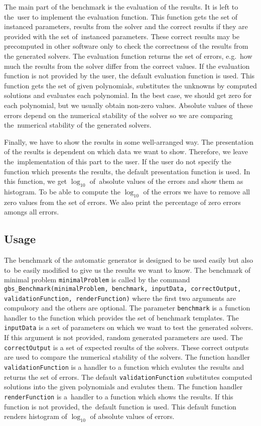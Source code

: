 The main part of the benchmark is the evaluation of the results. It is left to the~user to implement the evaluation function. This function gets the set of instanced parameters, results from the solver and the correct results if they are provided with the set of~instanced parameters. These correct results may be precomputed in other software only to check the correctness of the results from the generated solvers. The evaluation function returns the set of errors, e.g.\ how much the results from the solver differ from the correct values. If the evaluation function is not provided by the user, the default evaluation function is used. This function gets the set of given polynomials, substitutes the unknowns by computed solutions and evaluates each polynomial. In the best case, we should get zero for each polynomial, but we usually obtain non-zero values. Absolute values of these errors depend on the numerical stability of the solver so we are comparing the~numerical stability of the generated solvers.

Finally, we have to show the results in some well-arranged way. The presentation of the results is dependent on which data we want to show. Therefore, we leave the~implementation of this part to the user. If the user do not specify the function which presents the results, the default presentation function is used. In this function, we get $\log_{10}$ of~absolute values of the errors and show them as histogram. To be able to compute the $\log_{10}$ of the errors we have to remove all zero values from the set of errors. We also print the percentage of zero errors amongs all errors.

\subsection{Usage}
The benchmark of the automatic generator is designed to be used easily but also to~be easily modified to give us the results we want to know. The benchmark of minimal problem \texttt{minimalProblem} is called by the command \texttt{gbs\_Benchmark(minimal\-Prob\-lem, bench\-mark, input\-Data, correctOutput, validationFunction, render\-Func\-tion)} where the first two arguments are compulsory and the others are optional. The parameter \texttt{benchmark} is a function handler to the function which provides the set of benchmark templates. The \texttt{input\-Data} is a set of parameters on which we want to test the generated solvers. If this argument is not provided, random generated parameters are used. The \texttt{correctOutput} is a set of expected results of the solvers. These correct outputs are used to compare the numerical stability of the solvers. The function handler \texttt{validationFunction} is a handler to a function which evalutes the results and returns the set of errors. The default \texttt{validationFunction} substitutes computed solutions into the given polynomials and evalutes them. The function handler \texttt{renderFunction} is a~handler to a function which shows the results. If this function is not provided, the~default function is used. This default function renders histogram of $\log_{10}$ of absolute values of errors.


